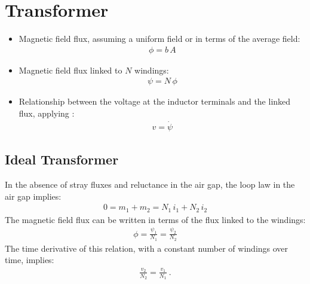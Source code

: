 \documentclass[letterpaper,10pt,english]{jupyterBook}
\begin{document}
\sphinxstepscope


\section{Transformer}
\label{\detokenize{ch/circuits-electromagnetic-transformer:transformer}}\label{\detokenize{ch/circuits-electromagnetic-transformer:classical-electromagnetism-circuits-electromagnetic-transformer}}\label{\detokenize{ch/circuits-electromagnetic-transformer::doc}}\begin{itemize}
\item {} 
\sphinxAtStartPar
Magnetic field flux, assuming a uniform field or in terms of the average field:
\begin{equation*}
\begin{split}\phi = b \, A\end{split}
\end{equation*}
\item {} 
\sphinxAtStartPar
Magnetic field flux linked to \(N\) windings:
\begin{equation*}
\begin{split}\psi = N \, \phi\end{split}
\end{equation*}
\item {} 
\sphinxAtStartPar
Relationship between the voltage at the inductor terminals and the linked flux, applying {\hyperref[\detokenize{ch/circuits-electric-induction:classical-electromagnetism-circuits-electric-induction}]{}}:
\begin{equation*}
\begin{split}v = \dot{\psi}\end{split}
\end{equation*}
\end{itemize}


\subsection{Ideal Transformer}
\label{\detokenize{ch/circuits-electromagnetic-transformer:ideal-transformer}}
\sphinxAtStartPar
In the absence of stray fluxes and reluctance in the air gap, the loop law in the air gap implies:
\begin{equation*}
\begin{split}0 = m_1 + m_2 = N_1 \, i_1 + N_2 \, i_2\end{split}
\end{equation*}
\sphinxAtStartPar
The magnetic field flux can be written in terms of the flux linked to the windings:
\begin{equation*}
\begin{split}\phi = \frac{\psi_1}{N_1} = \frac{\psi_2}{N_2}\end{split}
\end{equation*}
\sphinxAtStartPar
The time derivative of this relation, with a constant number of windings over time, implies:
\begin{equation*}
\begin{split}\frac{v_2}{N_2} = \frac{v_1}{N_1} \ .\end{split}
\end{equation*}
\end{document}
